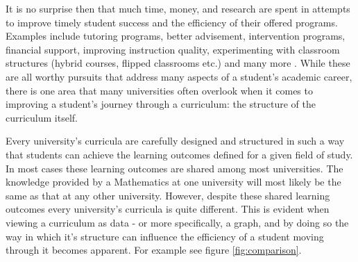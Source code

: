 \documentclass[botnum, fleqn]{unmeethesis}
\begin{document}
It is no surprise then that much time, money, and research are spent in attempts to improve timely student success and the efficiency of their offered programs. Examples include tutoring programs, better advisement, intervention programs, financial support, improving instruction quality, experimenting with classroom structures (hybrid courses, flipped classrooms etc.) and many more \cite{o2015use,topping1996effectiveness,hunter2004could,king2002identifying,lewallen1993early}. While these are all worthy pursuits that address many aspects of a student's academic career, there is one area that many universities often overlook when it comes to improving a student's journey through a curriculum: the structure of the curriculum itself.

Every university's curricula are carefully designed and structured in such a way that students can achieve the learning outcomes defined for a given field of study. In most cases these learning outcomes are shared among most universities. The knowledge provided by a Mathematics at one university will most likely be the same as that at any other university. However, despite these shared learning outcomes every university's curricula is quite different. This is evident when viewing a curriculum as data - or more specifically, a graph, and by doing so the way in which it's structure can influence the efficiency of a student moving through it becomes apparent. For example see figure \ref{fig:comparison}.
\end{document}
